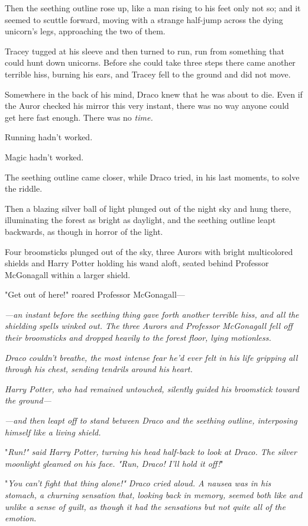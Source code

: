 Then the seething outline rose up, like a man rising to his feet only not so; 
and it seemed to scuttle forward, moving with a strange half-jump across the 
dying unicorn's legs, approaching the two of them.

Tracey tugged at his sleeve and then turned to run, run from something that 
could hunt down unicorns. Before she could take three steps there came another 
terrible hiss, burning his ears, and Tracey fell to the ground and did not move.

Somewhere in the back of his mind, Draco knew that he was about to die. Even if 
the Auror checked his mirror this very instant, there was no way anyone could 
get here fast enough. There was no \emph{time.}

Running hadn't worked.

Magic hadn't worked.

The seething outline came closer, while Draco tried, in his last moments, to 
solve the riddle.

Then a blazing silver ball of light plunged out of the night sky and hung 
there, illuminating the forest as bright as daylight, and the seething outline 
leapt backwards, as though in horror of the light.

Four broomsticks plunged out of the sky, three Aurors with bright multicolored 
shields and Harry Potter holding his wand aloft, seated behind Professor 
McGonagall within a larger shield.

"Get out of here!" roared Professor McGonagall---

\emph{---an instant before the seething thing gave forth another terrible hiss, 
and all the shielding spells winked out. The three Aurors and Professor 
McGonagall fell off their broomsticks and dropped heavily to the forest floor, 
lying motionless.}

\emph{Draco couldn't breathe, the most intense fear he'd ever felt in his life 
gripping all through his chest, sending tendrils around his heart.}

\emph{Harry Potter, who had remained untouched, silently guided his broomstick 
toward the ground---}

\emph{---and then leapt off to stand between Draco and the seething outline, 
interposing himself like a living shield.}

"\emph{Run!" said Harry Potter, turning his head half-back to look at Draco. 
The silver moonlight gleamed on his face. "Run, Draco! I'll hold it off!}"

"\emph{You can't fight that thing alone!" Draco cried aloud. A nausea was in 
his stomach, a churning sensation that, looking back in memory, seemed both 
like and unlike a sense of guilt, as though it had the sensations but not quite 
all of the emotion.}

